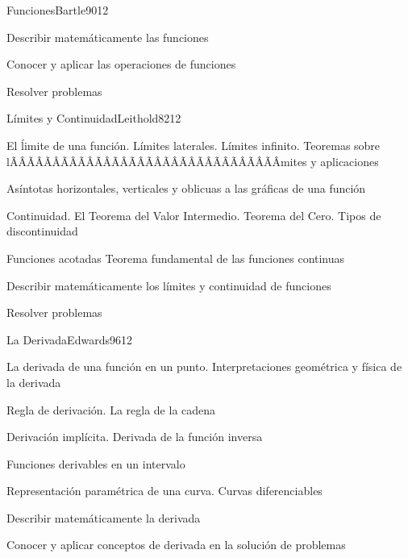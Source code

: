\begin{sumilla}
\begin{unit}{Funciones}{Bartle90}{12}
   \begin{objetivos}
      \item Describir matem\'aticamente las funciones
      \item Conocer y aplicar las operaciones de funciones
	\item Resolver problemas
   \end{objetivos}
\end{unit}

\begin{unit}{L\'imites y Continuidad}{Leithold82}{12}
\begin{topicos}
      \item El \'limite de una funci\'on. L\'imites laterales. L\'imites  infinito. Teoremas sobre lÃÂÃÂÃÂÃÂÃÂÃÂÃÂÃÂÃÂÃÂÃÂÃÂÃÂÃÂÃÂÃÂ­mites y aplicaciones
      \item As\'intotas horizontales, verticales y oblicuas a las gr\'aficas de una funci\'on
      \item Continuidad. El Teorema del Valor Intermedio. Teorema del Cero. Tipos de discontinuidad
      \item Funciones acotadas Teorema fundamental de las funciones continuas
	\end{topicos}

   \begin{objetivos}
      \item Describir matem\'aticamente los l\'imites y continuidad de funciones
	\item Resolver problemas
   \end{objetivos}
\end{unit}

\begin{unit}{La Derivada}{Edwards96}{12}
\begin{topicos}
	\item La derivada de una funci\'on en un punto. Interpretaciones geom\'etrica y f\'isica de la derivada
	\item Regla de derivaci\'on. La regla de la cadena
	\item Derivaci\'on impl\'icita. Derivada de la funci\'on inversa
	\item Funciones derivables en un intervalo
	\item Representaci\'on param\'etrica de una curva. Curvas diferenciables
\end{topicos}

\begin{objetivos}
	\item Describir matem\'aticamente la derivada
	\item Conocer y aplicar conceptos de derivada en la soluci\'on de problemas
\end{objetivos}
\end{unit}


\end{sumilla}
